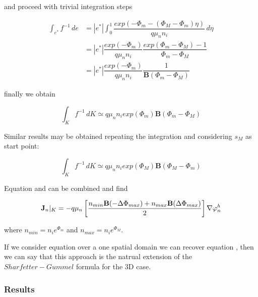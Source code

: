 and proceed with trivial integration steps

\begin{align*}
\int_{e^*} f^{-1} \, de & = |e^*| \int_0^1 \dfrac{exp \left(-\Phi_m - (\Phi_M-\Phi_m)\eta \right)}{q\mu_n n_i} 
 \, d\eta \\
  & = |e^*|\dfrac{exp (-\Phi_m)}{q\mu_n n_i} \dfrac{exp ( \Phi_m-\Phi_M)-1}{\Phi_m-\Phi_M} \\
 & =  |e^*|\dfrac{exp (-\Phi_m)}{q\mu_n n_i} \dfrac{1}{\mathbf{B}(\Phi_m-\Phi_M)}
\end{align*}

finally we obtain

\begin{equation}
\label{eq: finally approzimation 3D to 1D}
\int_{K} f^{-1} \, dK \simeq  q \mu_n n_i exp(\Phi_m) \mathbf{B}(\Phi_m-\Phi_M)
\end{equation}

Similar results may be obtained repeating the integration and considering $s_M$ as start point:

\begin{equation}
\label{eq: approssimazione sm}
\int_{K} f^{-1} \, dK \simeq  q \mu_n n_i exp(\Phi_M) \mathbf{B}(\Phi_M-\Phi_m)
\end{equation}

Equation  and  can be combined and find

\begin{equation}
\label{eq: first formula for J}
\mathbf{J}_n|_K = -  q \mu_n  \left[ \dfrac{ n_{min} \mathbf{B}(-\Delta \Phi_{max})  + n_{max}\mathbf{B}(\Delta \Phi_{max})}{2} \right]\nabla \varphi_n^h
\end{equation}

where $n_{min}=n_i e^{\Phi_m}$ and $n_{max}=n_i e^{\Phi_M}$.

If we consider equation  over a one spatial domain we can recover equation , then we can say that this approach is the natrual extension of the $Sharfetter-Gummel$ formula for the 3D case.

\subsubsection{Results}

\begin{figure}[!h]
\centering
{}
\end{figure} 

